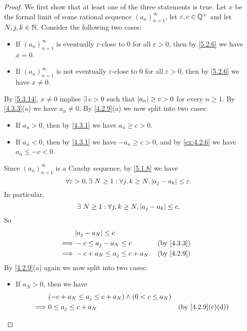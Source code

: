 \begin{proof}
  We first show that at least one of the three statements is true.
  Let \(x\) be the formal limit of some rational sequence \((a_n)_{n = 1}^{\infty}\), let \(\varepsilon, c \in \mathbb{Q}^+\) and let \(N, j, k \in \mathbb{N}\).
  Consider the following two cases:
  \begin{itemize}
    \item If \((a_n)_{n = 1}^{\infty}\) is eventually \(\varepsilon\)-close to \(0\) for all \(\varepsilon > 0\), then by \cref{5.2.6} we have \(x = 0\).
    \item If \((a_n)_{n = 1}^{\infty}\) is not eventually \(\varepsilon\)-close to \(0\) for all \(\varepsilon > 0\), then by \cref{5.2.6} we have \(x \neq 0\).
  \end{itemize}
  By \cref{5.3.14}, \(x \neq 0\) implies \(\exists\ c > 0\) such that \(\left\lvert a_n\right\rvert \geq c > 0\) for every \(n \geq 1\).
  By \cref{4.3.3}(a) we have \(a_n \neq 0\).
  By \cref{4.2.9}(a) we now split into two cases:
  \begin{itemize}
    \item If \(a_n > 0\), then by \cref{4.3.1} we have \(a_n \geq c > 0\).
    \item If \(a_n < 0\), then by \cref{4.3.1} we have \(-a_n \geq c > 0\), and by \cref{ex:4.2.6} we have \(a_n \leq -c < 0\).
  \end{itemize}
  Since \((a_n)_{n = 1}^{\infty}\) is a Cauchy sequence, by \cref{5.1.8} we have
  \[
    \forall \varepsilon > 0, \exists\ N \geq 1 : \forall j, k \geq N, \left\lvert a_j - a_k\right\rvert \leq \varepsilon.
  \]
  In particular,
  \[
    \exists\ N \geq 1 : \forall j, k \geq N, \left\lvert a_j - a_k\right\rvert \leq c.
  \]
  So
  \begin{align*}
             & \abs{a_j - a_N} \leq c                          \\
    \implies & -c \leq a_j - a_N \leq c        &  & \by{4.3.3} \\
    \implies & -c + a_N \leq a_j \leq c + a_N. &  & \by{4.2.9} \\
  \end{align*}
  By \cref{4.2.9}(a) again we now split into two cases:
  \begin{itemize}
    \item If \(a_N > 0\), then we have
          \begin{align*}
                     & (-c + a_N \leq a_j \leq c + a_N) \land (0 < c \leq a_N)                                               \\
            \implies & 0 \leq a_j \leq c + a_N                                 &            & \text{(by \cref{4.2.9}(c)(d))} \\

\end{align*}
\end{itemize}
\end{proof}
